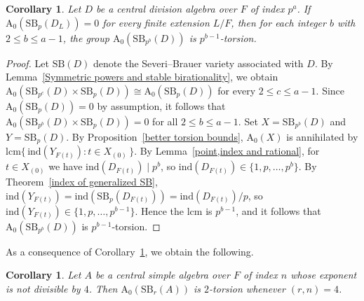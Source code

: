 \documentclass[10pt]{amsart}
\theoremstyle{plain}
\newtheorem{corollary}[thm]{Corollary}
\theoremstyle{definition}
\begin{document}
\begin{corollary}\label{reduction in torsion}
Let \(D\) be a central division algebra over \(F\) of index \(p^a\). If \(\mathrm{A_0}(\mathrm{SB}_p(D_L))=0\) for every finite extension \(L/F\), then for each integer \(b\) with \(2 \leq b \leq a-1\), the group \(\mathrm{A_0}(\mathrm{SB}_{p^b}(D))\) is \(p^{b-1}\)-torsion.
\end{corollary}

\begin{proof}
Let \(\mathrm{SB}(D)\) denote the Severi--Brauer variety associated with \(D\). By Lemma~\ref{Symmetric powers and stable birationality}, we obtain \(\mathrm{A_0}(\mathrm{SB}_{p^c}(D) \times \mathrm{SB}_p(D)) \cong \mathrm{A_0}(\mathrm{SB}_p(D))\) for every \(2 \leq c \leq a-1\). Since \(\mathrm{A_0}(\mathrm{SB}_p(D))=0\) by assumption, it follows that \(\mathrm{A_0}(\mathrm{SB}_{p^b}(D) \times \mathrm{SB}_p(D))=0\) for all \(2 \le b \le a-1\). Set \(X=\mathrm{SB}_{p^b}(D)\) and \(Y=\mathrm{SB}_p(D)\). By Proposition~\ref{better torsion bounds}, \(\mathrm{A_0}(X)\) is annihilated by \(\mathrm{lcm}\{\,\mathrm{ind}(Y_{F(t)}) : t \in X_{(0)}\,\}\). By Lemma~\ref{point,index and rational}, for \(t \in X_{(0)}\) we have \(\mathrm{ind}(D_{F(t)}) \mid p^b\), so \(\mathrm{ind}(D_{F(t)}) \in \{1,p,\dots,p^b\}\). By Theorem~\ref{index of generalized SB}, \(\mathrm{ind}(Y_{F(t)}) = \mathrm{ind}(\mathrm{SB}_p(D_{F(t)})) = \mathrm{ind}(D_{F(t)})/p\), so \(\mathrm{ind}(Y_{F(t)}) \in \{1,p,\dots,p^{b-1}\}\). Hence the lcm is \(p^{b-1}\), and it follows that \(\mathrm{A_0}(\mathrm{SB}_{p^b}(D))\) is \(p^{b-1}\)-torsion.
\end{proof}


As a consequence of Corollary~\ref{reduction in torsion}, we obtain the following.
\begin{corollary}\label{2-torsion}
   Let \(A\) be a central simple algebra over \(F\) of index \(n\) whose exponent is not divisible by \(4\). Then \(\mathrm{A_0}(\mathrm{SB}_r(A))\) is \(2\)-torsion whenever \((r,n)=4\). 
\end{corollary}
\end{document}
